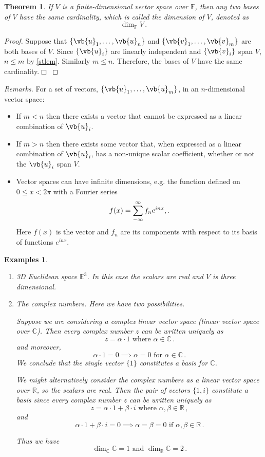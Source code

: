 \documentclass{article}
\theoremstyle{plain}\theoremheaderfont{\normalfont\itshape}\theorembodyfont{\rmfamily}\theoremseparator{.}\newtheorem*{rem}{Remark}\newtheorem*{ex}{Example}\newtheorem*{proof}{Proof}\newtheorem*{altp}{Alternative proof}
\theoremstyle{plain}\theoremheaderfont{\normalfont\bfseries}\theorembodyfont{\rmfamily}\theoremseparator{.}\newtheorem{thm}{Theorem}[section]\newtheorem{lem}[thm]{Lemma}\newtheorem{prop}[thm]{Proposition}\newtheorem*{cor}{Corollary}\newtheorem{defn}[thm]{Definition}\newtheorem{clm}[thm]{Claim}\newtheorem{clminproof}{Claim}
\theoremstyle{break}\theoremheaderfont{\normalfont\itshape}\theorembodyfont{\rmfamily}\theoremseparator{.\medskip}\newtheorem*{proofskip}{Proof}\newtheorem*{exs}{Examples}\newtheorem*{rems}{Remarks}
\theoremstyle{break}\theoremheaderfont{\normalfont\bfseries}\theorembodyfont{\rmfamily}\theoremseparator{.\medskip}\newtheorem{lemskip}[thm]{Lemma}\newtheorem{defnskip}[thm]{Definition}\newtheorem{propskip}[thm]{Proposition}\newtheorem{thmskip}[thm]{Theorem}
\numberwithin{equation}{section}
\newcommand{\qed}{\hfill\ensuremath{\Box}}
\begin{document}
	\begin{thm}
		If \(V\) is a finite-dimensional vector space over \(\mathbb{F}\), then any two bases of \(V\) have the same cardinality, which is called the \textit{dimension} of \(V\), denoted as
		\[\dim_\mathbb{F} V\,.\]
	\end{thm}
	\begin{proof}
		Suppose that \(\{\vb{u}_1,\dots,\vb{u}_n\}\) and \(\{\vb{v}_1,\dots,\vb{v}_m\}\) are both bases of \(V\). Since \(\{\vb{u}_i\}\) are linearly independent and \(\{\vb{v}_i\}\) span \(V\), \(n\le m\) by \cref{stlem}. Similarly \(m\le n\). Therefore, the bases of \(V\) have the same cardinality.\qed
	\end{proof}
	\textit{Remarks.} For a set of vectors, \(\{\vb{u}_1,\dots,\vb{u}_m\}\), in an \(n\)-dimensional vector space:
	\begin{itemize}[topsep=0pt]
		\item If \(m<n\) then there exists a vector that cannot be expressed as a linear combination of \(\vb{u}_i\).
		\item If \(m>n\) then there exists some vector that, when expressed as a linear combination of \(\vb{u}_i\), has a non-unique scalar coefficient, whether or not the \(\vb{u}_i\) span \(V\).
		\item Vector spaces can have infinite dimensions, e.g. the function defined on \(0\le x<2\pi\) with a Fourier series
		\[f(x)=\sum_{-\infty}^{\infty}f_n e^{inx}\\,.\]
		Here \(f(x)\) is the vector and \(f_n\) are its components with respect to its basis of functions \(e^{inx}\).
	\end{itemize}
	
	\begin{exs}
		\begin{enumerate}[topsep=0pt,label=(\roman*),itemsep=0pt,parsep=1em]
			\item \textit{3D Euclidean space \(\mathbb{E}^3\).} In this case the scalars are real and \(V\) is three dimensional.
			\item \textit{The complex numbers.} Here we have two possibilities.
			
			Suppose we are considering a complex linear vector space (linear vector space over \(\mathbb{C}\)). Then every complex number \(z\) can be written uniquely as
			\[z=\alpha\cdot 1\text{ where }\alpha\in\mathbb{C}\,.\]
			and moreover,
			\[\alpha\cdot 1=0\implies \alpha=0\text{ for }\alpha\in\mathbb{C}\,.\]
			We conclude that the single vector \(\{1\}\) constitutes a basis for \(\mathbb{C}\).
			
			We might alternatively consider the complex numbers as a linear vector space over \(\mathbb{R}\), so the scalars are real. Then the pair of vectors \(\{1,i\}\) constitute a basis since every complex number \(z\) can be written uniquely as
			\[z=\alpha\cdot 1+\beta\cdot i\text{ where }\alpha,\beta\in\mathbb{R}\,,\]
			and 
			\[\alpha\cdot 1+\beta\cdot i=0\implies\alpha=\beta=0\text{ if }\alpha,\beta\in\mathbb{R}\,.\]
			
			Thus we have
			\[\dim_{\mathbb{C}}\mathbb{C}=1\text{ and }\dim_{\mathbb{R}}\mathbb{C}=2\,.\]
		\end{enumerate}
	\end{exs}
	
\end{document}
